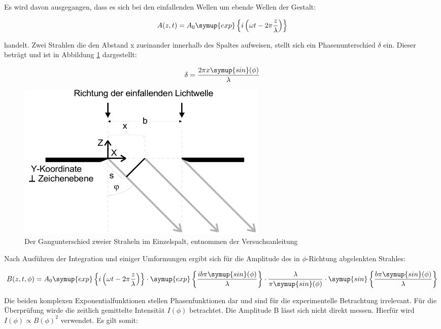 Es wird davon ausgegangen, dass es sich bei den einfallenden Wellen um ebende Wellen der Gestalt:

\begin{equation}
  A(z,t) = A_0 \symup{exp}\left\{i \left(\omega t - 2\pi \frac{z}{\lambda} \right) \right\}
\end{equation}

handelt.
Zwei Strahlen die den Abstand x zueinander innerhalb des Spaltes aufweisen, stellt sich ein Phasenunterschied $\delta$ ein.
Dieser beträgt und ist in Abbildung \ref{fig:Phasenunterschied} dargestellt:

\begin{equation}
  \delta = \frac{2\pi x \symup{sin}(\phi)}{\lambda}
\end{equation}

\begin{figure}
  \centering
  \includegraphics[scale=0.7]{images/Phasenunterschied.png}
  \caption{Der Gangunterschied zweier Straheln im Einzelspalt, entnommen der Versuchsanleitung \cite[32]{1}}
  \label{fig:Phasenunterschied}
\end{figure}

Nach Ausführen der Integration und einiger Umformungen ergibt sich für die Amplitude des in $\phi$-Richtung abgelenkten Strahles:

\begin{equation}
  B(z, t, \phi) = A_0 \symup{exp}\left\{i \left(\omega t - 2\pi \frac{z}{\lambda} \right) \right\}
  \cdot \symup{exp}\left\{ \frac{i b \pi \symup{sin}(\phi)}{\lambda} \right\}
  \cdot \frac{\lambda}{\pi \symup{sin}(\phi)}
  \cdot \symup{sin} \left\{ \frac{b \pi \symup{sin}(\phi)}{\lambda} \right\}
\end{equation}

Die beiden komplexen Exponentialfunktionen stellen Phasenfunktionen dar und sind für die experimentelle Betrachtung irrelevant.
Für die Überprüfung wirde die zeitlich gemittelte Intensität $I(\phi)$ betrachtet.
Die Amplitude B lässt sich nicht direkt messen.
Hierfür wird $I(\phi) \propto B(\phi)^2$ verwendet.
Es gilt somit:

